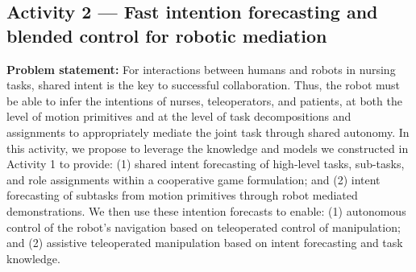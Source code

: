 \documentclass[letterpaper, 11 pt, onecolumn]{article}
\begin{document}


 









\subsection{Activity 2 --- Fast intention forecasting and blended control for robotic mediation}\label{sec:plan-intent}
\noindent
{\bf Problem statement:} For interactions between humans and robots in nursing tasks, shared intent is the key to successful collaboration.
Thus, the robot must be able to infer the intentions of nurses, teleoperators, and patients, at both the level of motion primitives and at the level of task decompositions and assignments to appropriately mediate the joint task through shared autonomy. In this activity, we propose to leverage the knowledge and models we constructed in Activity 1 to provide: (1) shared intent forecasting of high-level tasks, sub-tasks, and role assignments within a cooperative game formulation; and (2) intent forecasting of subtasks from motion primitives through robot mediated demonstrations. We then use these intention forecasts to enable: (1) autonomous control of the robot's navigation based on teleoperated control of manipulation; and (2) assistive teleoperated manipulation based on intent forecasting and task knowledge.
\end{document}
